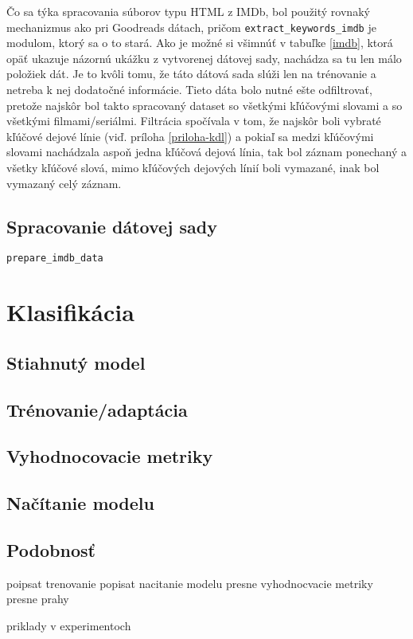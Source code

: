 Čo sa týka spracovania súborov typu HTML z IMDb, bol použitý rovnaký mechanizmus ako pri Goodreads dátach, pričom {\tt extract\_keywords\_imdb} je modulom, ktorý sa o to stará. Ako je možné si všimnúť v tabuľke \ref{imdb}, ktorá opäť ukazuje názornú ukážku z vytvorenej dátovej sady, nachádza sa tu len málo položiek dát. Je to kvôli tomu, že táto dátová sada slúži len na trénovanie a netreba k nej dodatočné informácie. Tieto dáta bolo nutné ešte odfiltrovať, pretože najskôr bol takto spracovaný dataset so všetkými kľúčovými slovami a so všetkými filmami/seriálmi. Filtrácia spočívala v tom, že najskôr boli vybraté kľúčové dejové línie (viď. príloha \ref{priloha-kdl}) a pokiaľ sa medzi kľúčovými slovami nachádzala aspoň jedna kľúčová dejová línia, tak bol záznam ponechaný a všetky kľúčové slová, mimo kľúčových dejových línií boli vymazané, inak bol vymazaný celý záznam.   

\subsection*{Spracovanie dátovej sady}
{\tt prepare\_imdb\_data}


\section{Klasifikácia}

\subsection*{Stiahnutý model}
\subsection*{Trénovanie/adaptácia}
\subsection*{Vyhodnocovacie metriky}
\subsection*{Načítanie modelu}
\subsection*{Podobnosť}

poipsat trenovanie
popisat nacitanie modelu 
presne vyhodnocvacie metriky
presne prahy

priklady v experimentoch


